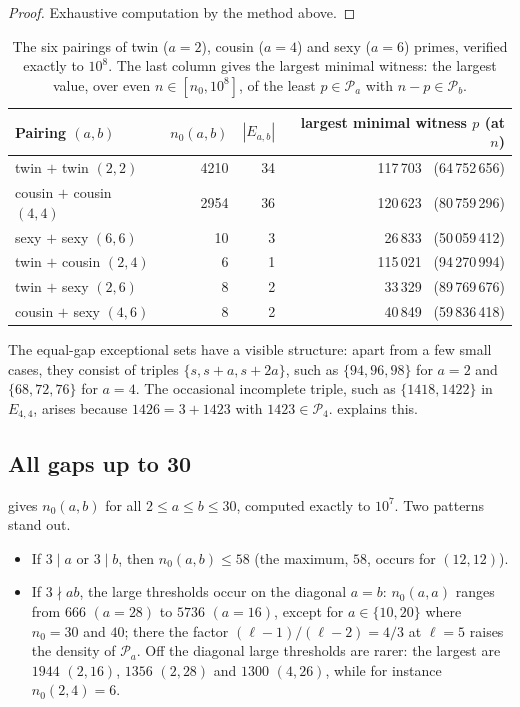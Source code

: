 \documentclass[11pt]{amsart}
\theoremstyle{definition}
\theoremstyle{remark}
\newcommand{\PP}{\mathcal{P}}
\begin{document}
\begin{proof}
Exhaustive computation by the method above.
\end{proof}

\begin{table}[t]
\centering
\caption{The six pairings of twin ($a=2$), cousin ($a=4$) and sexy ($a=6$) primes, verified exactly to $10^8$. The last column gives the largest minimal witness: the largest value, over even $n\in[n_0,10^8]$, of the least $p\in\PP_a$ with $n-p\in\PP_b$.}
\label{tab:six}
\begin{tabular}{lrrr}
\toprule
Pairing $(a,b)$ & $n_0(a,b)$ & $|E_{a,b}|$ & largest minimal witness $p$ (at $n$) \\
\midrule
twin $+$ twin $(2,2)$ & 4210 & 34 & 117\,703 \ (64\,752\,656) \\
cousin $+$ cousin $(4,4)$ & 2954 & 36 & 120\,623 \ (80\,759\,296) \\
sexy $+$ sexy $(6,6)$ & 10 & 3 & 26\,833 \ (50\,059\,412) \\
twin $+$ cousin $(2,4)$ & 6 & 1 & 115\,021 \ (94\,270\,994) \\
twin $+$ sexy $(2,6)$ & 8 & 2 & 33\,329 \ (89\,769\,676) \\
cousin $+$ sexy $(4,6)$ & 8 & 2 & 40\,849 \ (59\,836\,418) \\
\bottomrule
\end{tabular}
\end{table}

The equal-gap exceptional sets have a visible structure: apart from a few small cases, they consist of triples $\{s,s+a,s+2a\}$, such as $\{94,96,98\}$ for $a=2$ and $\{68,72,76\}$ for $a=4$. The occasional incomplete triple, such as $\{1418,1422\}$ in $E_{4,4}$, arises because $1426=3+1423$ with $1423\in\PP_4$.  explains this.

\subsection{All gaps up to 30}
 gives $n_0(a,b)$ for all $2\le a\le b\le 30$, computed exactly to $10^7$. Two patterns stand out.

\begin{itemize}
\item If $3\mid a$ or $3\mid b$, then $n_0(a,b)\le 58$ (the maximum, $58$, occurs for $(12,12)$).
\item If $3\nmid ab$, the large thresholds occur on the diagonal $a=b$: $n_0(a,a)$ ranges from $666$ $(a=28)$ to $5736$ $(a=16)$, except for $a\in\{10,20\}$ where $n_0=30$ and $40$; there the factor $(\ell-1)/(\ell-2)=4/3$ at $\ell=5$ raises the density of $\PP_a$. Off the diagonal large thresholds are rarer: the largest are $1944$ $(2,16)$, $1356$ $(2,28)$ and $1300$ $(4,26)$, while for instance $n_0(2,4)=6$.
\end{itemize}
\end{document}
